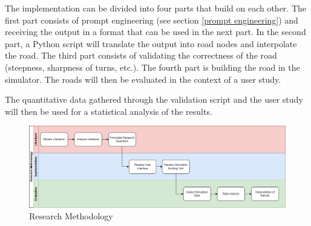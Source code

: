 The implementation can be divided into four parts that build on each other. The first part consists of prompt engineering (see section \ref{prompt engineering}) and receiving the output in a format that can be used in the next part. In the second part, a Python script will translate the output into road nodes and interpolate the road. The third part consists of validating the correctness of the road (steepness, sharpness of turns, etc.). The fourth part is building the road in the simulator. The roads will then be evaluated in the context of a user study. 

The quantitative data gathered through the validation script and the user study will then be used for a statistical analysis of the results.

\begin{figure}[ht!]
	\centering
	\includegraphics[width=1\linewidth]{images/Research_Methodology.jpg}
	\caption{Research Methodology \label{research methodology}}
\end{figure}

